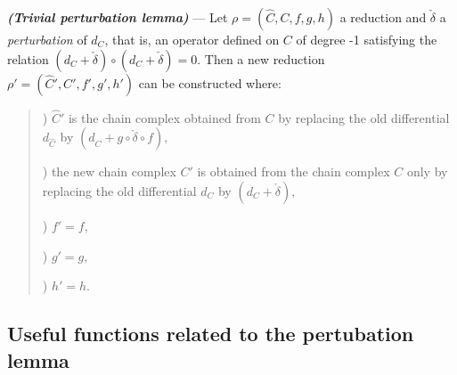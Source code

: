 \begin{thr}
{\em \bf (Trivial perturbation lemma)} --- Let
$\rho=(\hat{C},C,f,g,h)$ a reduction and ${\check\delta}$ a {\em perturbation} of
$d_C$, that is, an operator defined on $C$ of degree -1 satisfying
the relation $(d_C+{\check\delta})\circ (d_C+{\check\delta})=0$.
Then a new reduction $\rho'=(\hat{C}',C',f',g',h')$ can be constructed where:
\begin{quotation}

) $\hat{C}'$ is the chain complex obtained from $C$ by replacing the old
differential $d_{\hat{C}}$ by $(d_{\hat{C}}+ g \circ {\check\delta} \circ f),$

) the new chain complex $C'$ is obtained from the chain complex $C$ only by
replacing  the old differential $d_C$ by $(d_C +{\check \delta}),$

) $f'= f,$

) $g'= g,$

) $h'= h.$
\end{quotation}
\end{thr}

\subsection {Useful functions related to the pertubation lemma}

